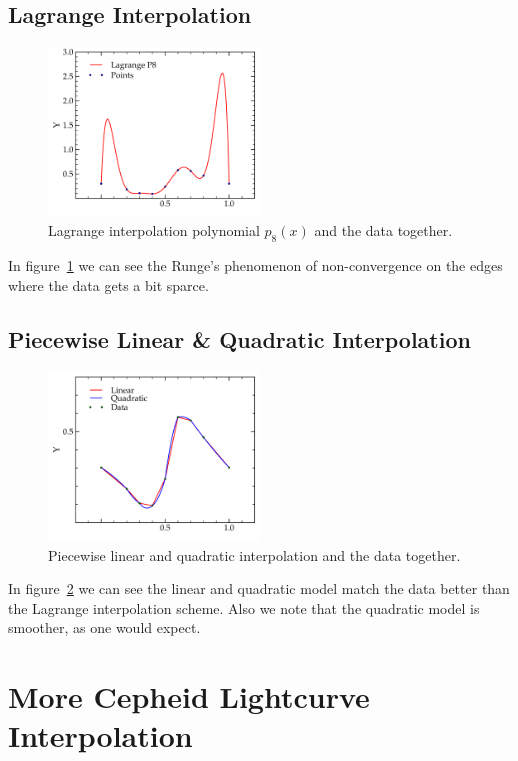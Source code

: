 \documentclass[11pt,letterpaper]{article}
\begin{document}
\subsection{Lagrange Interpolation}
\begin{figure}[bth]
\centering
\includegraphics[width=0.5\textwidth]{lagrange.pdf}
\caption{Lagrange interpolation polynomial $p_8(x)$ and the data together.}
\label{fig:lagrange}
\end{figure}

In figure~\ref{fig:lagrange} we can see the Runge's phenomenon of 
non-convergence on the edges where the data gets a bit sparce. 

\subsection{Piecewise Linear \& Quadratic Interpolation}

\begin{figure}[bth]
\centering
\includegraphics[width=0.5\textwidth]{lin_quad.pdf}
\caption{Piecewise linear and quadratic interpolation and the data together.}
\label{fig:lin_quad}
\end{figure}

In figure~\ref{fig:lin_quad} we can see the linear and quadratic model match the
data better than the Lagrange interpolation scheme. Also we note that the 
quadratic model is smoother, as one would expect.

\section{More Cepheid Lightcurve Interpolation}
\end{document}
